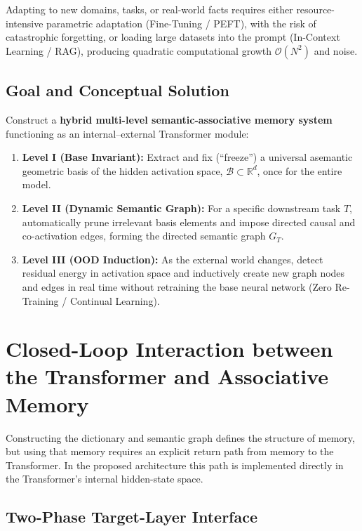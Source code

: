 \documentclass[11pt,a4paper]{article}
\begin{document}
Adapting to new domains, tasks, or real-world facts requires either resource-intensive parametric adaptation (Fine-Tuning / PEFT), with the risk of catastrophic forgetting, or loading large datasets into the prompt (In-Context Learning / RAG), producing quadratic computational growth $\mathcal{O}(N^2)$ and noise.

\subsection*{Goal and Conceptual Solution}
Construct a \textbf{hybrid multi-level semantic-associative memory system} functioning as an internal--external Transformer module:
\begin{enumerate}
\item \textbf{Level I (Base Invariant):} Extract and fix (``freeze'') a universal asemantic geometric basis of the hidden activation space, $\mathcal{B}\subset\mathbb{R}^d$, once for the entire model.
\item \textbf{Level II (Dynamic Semantic Graph):} For a specific downstream task $T$, automatically prune irrelevant basis elements and impose directed causal and co-activation edges, forming the directed semantic graph $G_T$.
\item \textbf{Level III (OOD Induction):} As the external world changes, detect residual energy in activation space and inductively create new graph nodes and edges in real time without retraining the base neural network (Zero Re-Training / Continual Learning).
\end{enumerate}

\section{Closed-Loop Interaction between the Transformer and Associative Memory}

Constructing the dictionary and semantic graph defines the structure of memory, but using that memory requires an explicit return path from memory to the Transformer. In the proposed architecture this path is implemented directly in the Transformer's internal hidden-state space.

\subsection*{Two-Phase Target-Layer Interface}
\end{document}

